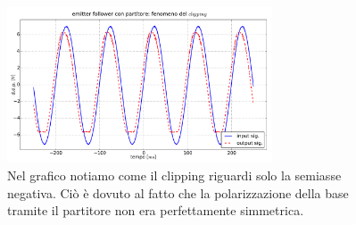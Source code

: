 \begin{figure}[h]
\centering
	\includegraphics[width=0.7\textwidth]{clip.pdf}
	\caption{Nel grafico notiamo come il clipping riguardi solo la semiasse negativa. Ciò è dovuto al fatto che la polarizzazione della base tramite il partitore non era perfettamente simmetrica.}
	\label{fig:clip}
\end{figure}